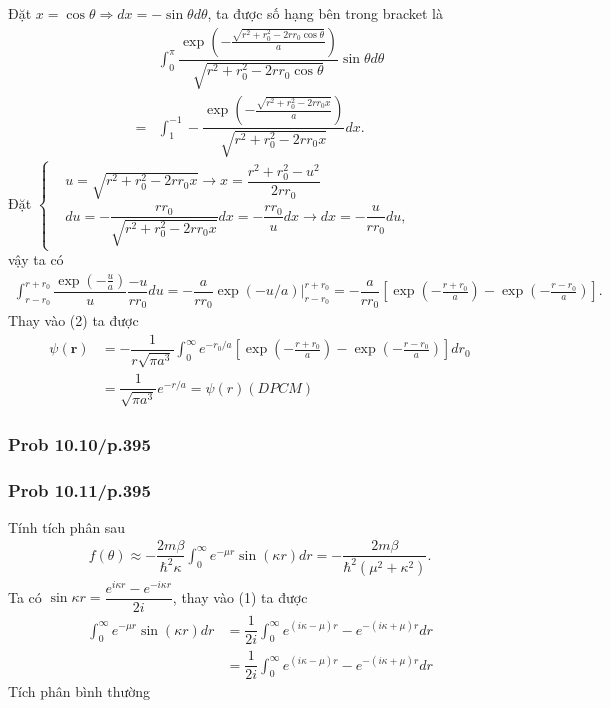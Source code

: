\documentclass{report}
\newcommand{\f}[2]{\dfrac{#1}{#2}}
\newcommand{\at}[2]{\bigg\rvert_{#1}^{#2} }
\begin{document}
Đặt $x = \cos\theta \Rightarrow dx = -\sin\theta d\theta$, ta được số hạng bên trong bracket là
\begin{align*}
	  & \int_{0}^{\pi}  \f{\exp\left(-\frac{\sqrt{r^2 + r_0^2 - 2rr_0\cos\theta}}{a}\right)}{\sqrt{r^2 + r_0^2 - 2rr_0\cos\theta}} \sin\theta  d\theta \\
	= & \int_{1}^{-1} -\f{\exp \left( -\frac{\sqrt{r^2 + r_0^2 - 2rr_0 x}}{a} \right) }{\sqrt{r^2 + r_0^2 - 2rr_0 x}} dx.
\end{align*}
Đặt
$
	\begin{cases}
		 & u = \sqrt{r^2 + r_0^2 - 2rr_0 x} \rightarrow x = \f{r^2 + r_0^2 - u^2}{2r r_0}                      \\
		 & du = -\f{rr_0}{\sqrt{r^2 + r_0^2 - 2rr_0 x}} dx = -\f{rr_0}{u} dx \rightarrow dx = -\f{u}{rr_0} du,
	\end{cases}
$\\
vậy ta có
\begin{align*}
	\int_{r-r_0}^{r+r_0}\f{\exp(-\frac{u}{a})}{u} \f{-u}{rr_0} du = -\f{a}{r r_0} \exp(-u/a)\at{r-r_0}{r+r_0} = -\f{a}{r r_0} \left[ \exp(-\frac{r+r_0}{a}) - \exp(-\frac{r-r_0}{a}) \right].
\end{align*}
Thay vào (2) ta được
\begin{align*}
	\psi(\mathbf{r})
	 & = -\f{1}{r\sqrt{\pi a^3}} \int_{0}^{\infty} e^{-r_0/a} \left[ \exp(-\frac{r+r_0}{a}) - \exp(-\frac{r-r_0}{a}) \right] dr_0 \\
	 & =  \f{1}{\sqrt{\pi a^3}} e^{-r/a} = \psi(r) (DPCM)
\end{align*}
\subsubsection{Prob 10.10/p.395}

\subsubsection{Prob 10.11/p.395}
Tính tích phân sau
\begin{align*}
	f(\theta) \approx -\f{2m\beta}{\hbar^2 \kappa} \int_{0}^{\infty} e^{-\mu r} \sin(\kappa r) dr = - \f{2m\beta}{\hbar^2 (\mu^2 + \kappa^2)}. \tag{1}
\end{align*}
Ta có $\sin \kappa r = \f{e^{i\kappa r} - e^{-i\kappa r}}{2i}$, thay vào (1) ta được
\begin{align*}
	\int_{0}^{\infty} e^{-\mu r} \sin(\kappa r) dr
	 & = \f{1}{2i}\int_{0}^{\infty} e^{(i\kappa - \mu) r} - e^{-(i\kappa + \mu) r} dr \\
	 & = \f{1}{2i}\int_{0}^{\infty} e^{(i\kappa - \mu) r} - e^{-(i\kappa + \mu) r} dr
\end{align*}
Tích phân bình thường
\end{document}
